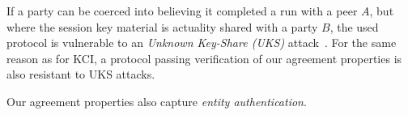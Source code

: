 If a party can be coerced into believing it completed a run with a peer $A$, but
where the session key material is actuality shared with a party $B$, the used
protocol is vulnerable to an \emph{Unknown Key-Share (UKS)}
attack~\cite{DBLP:conf/ima/Blake-WilsonJM97}.
%
For the same reason as for KCI, a protocol passing verification of our agreement
properties is also resistant to UKS attacks.
%

Our agreement properties also capture \emph{entity authentication}.
%


%
%

%



